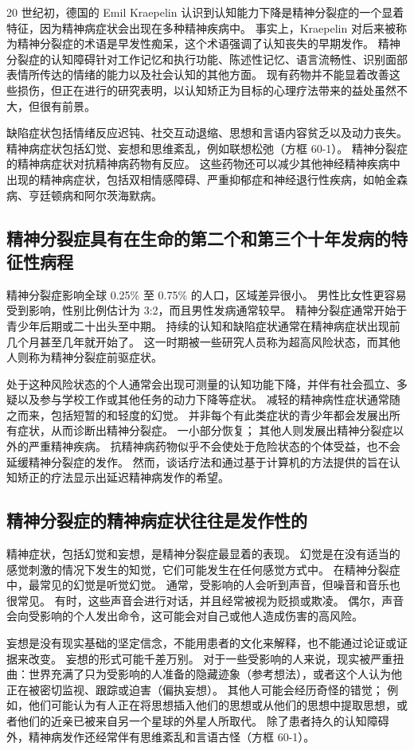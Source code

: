 20 世纪初，德国的 Emil Kraepelin 认识到认知能力下降是精神分裂症的一个显着特征，因为精神病症状会出现在多种精神疾病中。 事实上，Kraepelin 对后来被称为精神分裂症的术语是早发性痴呆，这个术语强调了认知丧失的早期发作。 精神分裂症的认知障碍针对工作记忆和执行功能、陈述性记忆、语言流畅性、识别面部表情所传达的情绪的能力以及社会认知的其他方面。 现有药物并不能显着改善这些损伤，但正在进行的研究表明，以认知矫正为目标的心理疗法带来的益处虽然不大，但很有前景。

缺陷症状包括情绪反应迟钝、社交互动退缩、思想和言语内容贫乏以及动力丧失。 精神病症状包括幻觉、妄想和思维紊乱，例如联想松弛（方框 60-1）。 精神分裂症的精神病症状对抗精神病药物有反应。 这些药物还可以减少其他神经精神疾病中出现的精神病症状，包括双相情感障碍、严重抑郁症和神经退行性疾病，如帕金森病、亨廷顿病和阿尔茨海默病。

\subsection{精神分裂症具有在生命的第二个和第三个十年发病的特征性病程}
精神分裂症影响全球 0.25\% 至 0.75\% 的人口，区域差异很小。 男性比女性更容易受到影响，性别比例估计为 3:2，而且男性发病通常较早。 精神分裂症通常开始于青少年后期或二十出头至中期。 持续的认知和缺陷症状通常在精神病症状出现前几个月甚至几年就开始了。 这一时期被一些研究人员称为超高风险状态，而其他人则称为精神分裂症前驱症状。

处于这种风险状态的个人通常会出现可测量的认知功能下降，并伴有社会孤立、多疑以及参与学校工作或其他任务的动力下降等症状。 减轻的精神病性症状通常随之而来，包括短暂的和轻度的幻觉。 并非每个有此类症状的青少年都会发展出所有症状，从而诊断出精神分裂症。 一小部分恢复； 其他人则发展出精神分裂症以外的严重精神疾病。 抗精神病药物似乎不会使处于危险状态的个体受益，也不会延缓精神分裂症的发作。 然而，谈话疗法和通过基于计算机的方法提供的旨在认知矫正的疗法显示出延迟精神病发作的希望。

\subsection{精神分裂症的精神病症状往往是发作性的}
精神症状，包括幻觉和妄想，是精神分裂症最显着的表现。 幻觉是在没有适当的感觉刺激的情况下发生的知觉，它们可能发生在任何感觉方式中。 在精神分裂症中，最常见的幻觉是听觉幻觉。 通常，受影响的人会听到声音，但噪音和音乐也很常见。 有时，这些声音会进行对话，并且经常被视为贬损或欺凌。 偶尔，声音会向受影响的个人发出命令，这可能会对自己或他人造成伤害的高风险。

妄想是没有现实基础的坚定信念，不能用患者的文化来解释，也不能通过论证或证据来改变。 妄想的形式可能千差万别。 对于一些受影响的人来说，现实被严重扭曲：世界充满了只为受影响的人准备的隐藏迹象（参考想法），或者这个人认为他正在被密切监视、跟踪或迫害（偏执妄想）。 其他人可能会经历奇怪的错觉； 例如，他们可能认为有人正在将思想插入他们的思想或从他们的思想中提取思想，或者他们的近亲已被来自另一个星球的外星人所取代。 除了患者持久的认知障碍外，精神病发作还经常伴有思维紊乱和言语古怪（方框 60-1）。

